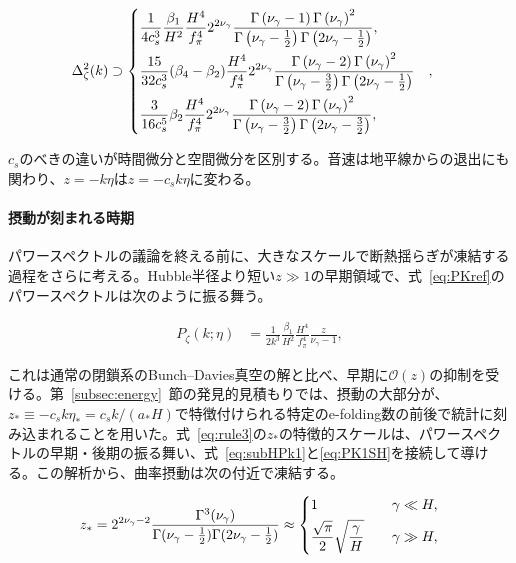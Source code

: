 \documentclass[a4paper,11pt]{ltjsarticle}
\numberwithin{equation}{section}
\newcommand{\Eq}[1]{Eq.~(\ref{#1})}
\newcommand{\Eqs}[1]{Eqs.~(\ref{#1})}
\newcommand{\Sec}[1]{Sec.~\ref{#1}}
\renewcommand{\Eq}[1]{式~\eqref{#1}}
\renewcommand{\Eqs}[1]{式~\eqref{#1}}
\renewcommand{\Sec}[1]{第~\ref{#1}~節}
\begin{document}
\begin{align}
   \Delta^2_\zeta(k) &\supset \begin{dcases}
   \frac{1}{4 c_{s}^{3}} \frac{\beta_1}{H^2}   \frac{H^4}{f_\pi^4}  2^{2\nu_\gamma} \frac{\Gamma\left(\nu_\gamma-1\right)\Gamma\left(\nu_\gamma\right)^2}{\Gamma\left(\nu_\gamma - \frac{1}{2}\right)\Gamma\left(2\nu_\gamma - \frac{1}{2}\right)},\\
\frac{15}{32 c_{s}^{3}}(\beta_4- \beta_2)\frac{H^4}{f_\pi^4} 2^{2\nu_\gamma} \frac{\Gamma\left(\nu_\gamma-2\right)\Gamma\left(\nu_\gamma\right)^2}{\Gamma\left(\nu_\gamma - \frac{3}{2}\right)\Gamma\left(2\nu_\gamma - \frac{1}{2}\right)} & ,\\
\frac{3}{16c_{s}^{5}} \beta_2\frac{H^4}{f_\pi^4} 2^{2\nu_\gamma} \frac{\Gamma\left(\nu_\gamma-2\right)\Gamma\left(\nu_\gamma\right)^2}{\Gamma\left(\nu_\gamma - \frac{3}{2}\right)\Gamma\left(2\nu_\gamma - \frac{3}{2}\right)}, & 
\end{dcases}
\end{align}

$c_s$のべきの違いが時間微分と空間微分を区別する。音速は地平線からの退出にも関わり、$z=-k\eta$は$z=-c_sk\eta$に変わる。

\paragraph{摂動が刻まれる時期} パワースペクトルの議論を終える前に、大きなスケールで断熱揺らぎが凍結する過程をさらに考える。Hubble半径より短い$z\gg1$の早期領域で、\Eq{eq:PKref}のパワースペクトルは次のように振る舞う。

\begin{align}\label{eq:subHPk1}
    P_\zeta(k;\eta) &=  \frac{1}{2k^3} \frac{\beta_{1}}{H^2} \frac{H^4}{f_\pi^4} \frac{z}{\nu_\gamma-1},
\end{align}

これは通常の閉鎖系のBunch--Davies真空の解と比べ、早期に$\mathcal O(z)$の抑制を受ける。\Sec{subsec:energy}の発見的見積もりでは、摂動の大部分が、$z_*\equiv-c_sk\eta_*=c_sk/(a_*H)$で特徴付けられる特定のe-folding数の前後で統計に刻み込まれることを用いた。\Eq{eq:rule3}の$z_*$の特徴的スケールは、パワースペクトルの早期・後期の振る舞い、\Eqs{eq:subHPk1}と\eqref{eq:PK1SH}を接続して導ける。この解析から、曲率摂動は次の付近で凍結する。

\begin{equation}
z_{*}=2^{2\nu_\gamma-2}\frac{\Gamma^{3}(\nu_\gamma)}{\Gamma(\nu_\gamma-\frac{1}{2})\Gamma(2\nu_\gamma-\frac{1}{2})} \approx \begin{dcases}
	1 & \gamma \ll H,\\
	\frac{\sqrt{\pi}}{2}\sqrt{\frac{\gamma}{H}} \quad & \gamma \gg H,
\end{dcases}
\end{equation}
\end{document}
